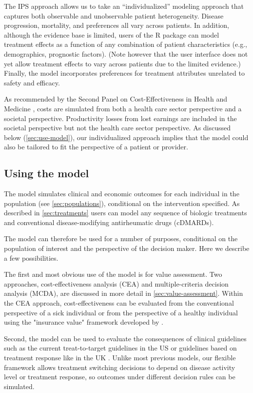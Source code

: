 \documentclass[11pt,final,fleqn]{article}\usepackage[]{graphicx}\usepackage[]{color}
\theoremstyle{plain}
\newcommand\R{{\textsf{R}}}
\begin{document}
The IPS approach allows us to take an ``individualized'' modeling approach that captures both observable and unobservable patient heterogeneity. Disease progression, mortality, and preferences all vary across patients. In addition, although the evidence base is limited, users of the \R{} package can model treatment effects as a function of any combination of patient characteristics (e.g., demographics, prognostic factors). (Note however that the user interface does not yet allow treatment effects to vary across patients due to the limited evidence.) Finally, the model incorporates preferences for treatment attributes unrelated to safety and efficacy. 

As recommended by the Second Panel on Cost-Effectiveness in Health and Medicine \citep{sanders2016recommendations}, costs are simulated from both a health care sector perspective and a societal perspective. Productivity losses from lost earnings are included in the societal perspective but not the health care sector perspective. As discussed below (\autoref{sec:use-model}), our individualized approach implies that the model could also be tailored to fit the perspective of a patient or provider.     

\subsection{Using the model}\label{sec:use-model}
The model simulates clinical and economic outcomes for each individual in the population (see \autoref{sec:populations}), conditional on the intervention specified. As described in \autoref{sec:treatments} users can model any sequence of biologic treatments and conventional disease-modifying antirheumatic drugs (cDMARDs). 

The model can therefore be used for a number of purposes, conditional on the population of interest and the perspective of the decision maker. Here we describe a few possibilities. 

The first and most obvious use of the model is for value assessment. Two approaches, cost-effectiveness analysis (CEA) and multiple-criteria decision analysis (MCDA), are discussed in more detail in \autoref{sec:value-assessment}. Within the CEA approach, cost-effectiveness can be evaluated from the conventional perspective of a sick individual or from the perspective of a healthy individual using the "insurance value" framework developed by \citet{lakdawalla2017insurance}. 

Second, the model can be used to evaluate the consequences of clinical guidelines such as the current treat-to-target guidelines in the US \citep{singh20162015} or guidelines based on treatment response like in the UK \citep{deighton2010bsr}. Unlike most previous models, our flexible framework allows treatment switching decisions to depend on disease activity level or treatment response, so outcomes under different decision rules can be simulated.   
\end{document}

